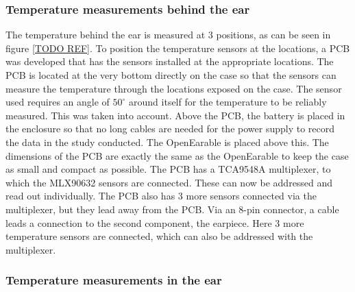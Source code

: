 \subsubsection{Temperature measurements behind the ear}

The temperature behind the ear is measured at 3 positions, as can be seen in figure \ref{TODO REF}.
To position the temperature sensors at the locations, a PCB was developed that has the sensors installed at the appropriate locations. 
The PCB is located at the very bottom directly on the case so that the sensors can measure the temperature through the locations exposed on the case.
The sensor used requires an angle of $ 50 ^ \circ$ around itself for the temperature to be reliably measured. 
This was taken into account.
Above the PCB, the battery is placed in the enclosure so that no long cables are needed for the power supply to record the data in the study conducted.
The OpenEarable is placed above this.
The dimensions of the PCB are exactly the same as the OpenEarable to keep the case as small and compact as possible.
The PCB has a TCA9548A multiplexer, to which the MLX90632 sensors are connected.
These can now be addressed and read out individually.
The PCB also has 3 more sensors connected via the multiplexer, but they lead away from the PCB.
Via an 8-pin connector, a cable leads a connection to the second component, the earpiece.
Here 3 more temperature sensors are connected, which can also be addressed with the multiplexer.

\subsubsection{Temperature measurements in the ear}

